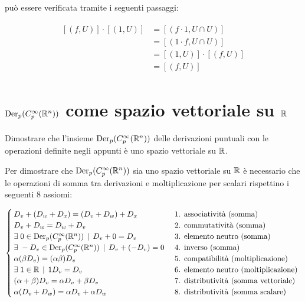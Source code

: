 può essere verificata tramite i seguenti passaggi:

\begin{align}
	\begin{split}
		[(f,U)] \cdot [(1,U)] &= [(f \cdot 1,U \cap U)]\\
		&= [(1 \cdot f,U \cap U)]\\
		&= [(1,U)] \cdot [(f,U)]\\
		&= [(f,U)]
	\end{split}
\end{align}

%

\newpage

%

\section{$ \operatorname{Der}_{p}(C_{p}^{\infty}(\mathbb{R}^{n})) $ come spazio vettoriale su $ \mathbb{R} $}\label{es1-8}

\begin{tcolorbox}
	Dimostrare che l'insieme $ \operatorname{Der}_{p}(C_{p}^{\infty}(\mathbb{R}^{n})) $ delle derivazioni puntuali con le operazioni definite negli appunti è uno spazio vettoriale su $ \mathbb{R} $.
\end{tcolorbox}

Per dimostrare che $ \operatorname{Der}_{p}(C_{p}^{\infty}(\mathbb{R}^{n})) $ sia uno spazio vettoriale su $ \mathbb{R} $ è necessario che le operazioni di somma tra derivazioni e moltiplicazione per scalari rispettino i seguenti 8 assiomi:

\begin{equation}
	\begin{cases}
		D_{v} + (D_{w} + D_{x}) = (D_{v} + D_{w}) + D_{x} & \text{ 1. associatività (somma) }\\
		D_{v} + D_{w} = D_{w} + D_{v} & \text{ 2. commutatività (somma) }\\
		\exists \; 0 \in \operatorname{Der}_{p}(C_{p}^{\infty}(\mathbb{R}^{n})) \, \mid \, D_{v} + 0 = D_{v} & \text{ 3. elemento neutro (somma) }\\
		\exists \; - D_{v} \in \operatorname{Der}_{p}(C_{p}^{\infty}(\mathbb{R}^{n})) \, \mid \, D_{v} + (- D_{v}) = 0 & \text{ 4. inverso (somma) }\\
		\alpha (\beta D_{v}) = (\alpha \beta) D_{v} & \text{ 5. compatibilità (moltiplicazione) }\\
		\exists \; 1 \in \mathbb{R} \, \mid \, 1 D_{v} = D_{v} & \text{ 6. elemento neutro (moltiplicazione) }\\
		(\alpha + \beta) D_{v} = \alpha D_{v} + \beta D_{v} & \text{ 7. distributività (somma vettoriale) }\\
		\alpha (D_{v} + D_{w}) = \alpha D_{v} + \alpha D_{w} & \text{ 8. distributività (somma scalare) }
	\end{cases}
\end{equation}

